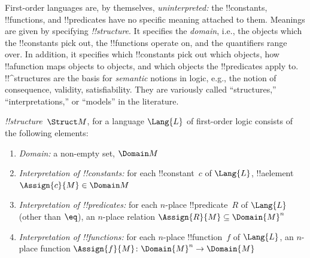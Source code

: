 \documentclass[../../../include/open-logic-section]{subfiles}
\begin{document}


\begin{explain}
First-order languages are, by themselves, \emph{uninterpreted:} the
!!{constant}s, !!{function}s, and !!{predicate}s have no specific
meaning attached to them.  Meanings are given by specifying
 \emph{!!{structure}}. It specifies the
\emph{domain}, i.e., the objects which the !!{constant}s pick out, the
!!{function}s operate on, and the quantifiers range over. In addition,
it specifies which !!{constant}s pick out which objects, how
!!a{function} maps objects to objects, and which objects the
!!{predicate}s apply to.  !!^{structure}s are the basis for
\emph{semantic} notions in logic, e.g., the notion of consequence,
validity, satisfiability. They are variously called ``structures,''
``interpretations,'' or ``models'' in the literature.
\end{explain}

\begin{defn}[!!^{structure}s]
 \emph{!!{structure}}~$\Struct M$, for a language
$\Lang{L}$ of first-order logic consists of the following elements:
\begin{enumerate}
\item \emph{Domain:} a non-empty set, $\Domain M$
\item \emph{Interpretation of !!{constant}s:} for each !!{constant}~$c$ of
  $\Lang{L}$, !!a{element} $\Assign{c}{M} \in \Domain M$
\item \emph{Interpretation of !!{predicate}s:} for each $n$-place
  !!{predicate}~$R$ of $\Lang{L}$ (other than $\eq$), an $n$-place
  relation $\Assign{R}{M} \subseteq \Domain{M}^n$
\item \emph{Interpretation of !!{function}s:} for each $n$-place
  !!{function}~$f$ of $\Lang{L}$, an $n$-place function $\Assign{f}{M}
  \colon \Domain{M}^n \to \Domain{M}$
\end{enumerate}
\end{defn}
\end{document}
